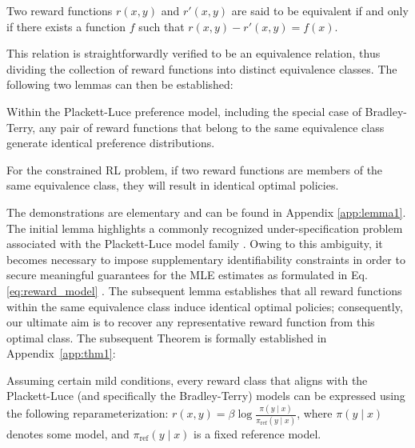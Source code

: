 \begin{definition}
Two reward functions $r(x, y)$ and $r'(x, y)$ are said to be equivalent if and only if there exists a function $f$ such that ${r(x, y) - r'(x, y) = f(x)}$.
\end{definition}

This relation is straightforwardly verified to be an equivalence relation, thus dividing the collection of reward functions into distinct equivalence classes. The following two lemmas can then be established:

\begin{lemma}\label{lemma:same_prefrence}
    Within the Plackett-Luce preference model, including the special case of Bradley-Terry, any pair of reward functions that belong to the same equivalence class generate identical preference distributions.
\end{lemma}

\begin{lemma}\label{lemma:same_policy}
    For the constrained RL problem, if two reward functions are members of the same equivalence class, they will result in identical optimal policies.
\end{lemma}

The demonstrations are elementary and can be found in Appendix \ref{app:lemma1}. The initial lemma highlights a commonly recognized under-specification problem associated with the Plackett-Luce model family \cite{plackett1975analysis}. Owing to this ambiguity, it becomes necessary to impose supplementary identifiability constraints in order to secure meaningful guarantees for the MLE estimates as formulated in Eq. \ref{eq:reward_model} \cite{bong2022generalized}. The subsequent lemma establishes that all reward functions within the same equivalence class induce identical optimal policies; consequently, our ultimate aim is to recover any representative reward function from this optimal class. The subsequent Theorem is formally established in Appendix~\ref{app:thm1}:

\begin{theorem}\label{thm:main}
    Assuming certain mild conditions, every reward class that aligns with the Plackett-Luce (and specifically the Bradley-Terry) models can be expressed using the following reparameterization: ${r(x, y) = \beta \log \frac{\pi(y\mid x)}{\pi_\text{ref}(y\mid x)}}$, where $\pi(y\mid x)$ denotes some model, and $\pi_\text{ref}(y \mid x)$ is a fixed reference model.
\end{theorem}

